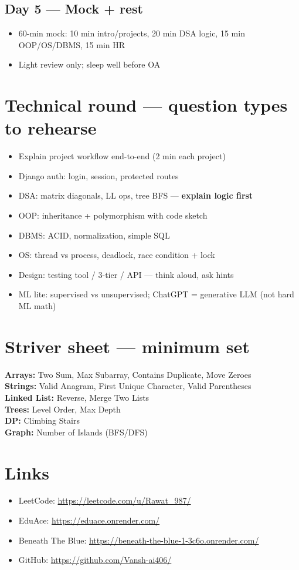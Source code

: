 \documentclass[11pt,a4paper]{article}
\begin{document}
\subsection{Day 5 --- Mock + rest}
\begin{itemize}
  \item 60-min mock: 10 min intro/projects, 20 min DSA logic, 15 min OOP/OS/DBMS, 15 min HR
  \item Light review only; sleep well before OA
\end{itemize}

\section{Technical round --- question types to rehearse}
\begin{itemize}
  \item Explain project workflow end-to-end (2 min each project)
  \item Django auth: login, session, protected routes
  \item DSA: matrix diagonals, LL ops, tree BFS --- \textbf{explain logic first}
  \item OOP: inheritance + polymorphism with code sketch
  \item DBMS: ACID, normalization, simple SQL
  \item OS: thread vs process, deadlock, race condition + lock
  \item Design: testing tool / 3-tier / API --- think aloud, ask hints
  \item ML lite: supervised vs unsupervised; ChatGPT = generative LLM (not hard ML math)
\end{itemize}

\section{Striver sheet --- minimum set}
\textbf{Arrays:} Two Sum, Max Subarray, Contains Duplicate, Move Zeroes\\
\textbf{Strings:} Valid Anagram, First Unique Character, Valid Parentheses\\
\textbf{Linked List:} Reverse, Merge Two Lists\\
\textbf{Trees:} Level Order, Max Depth\\
\textbf{DP:} Climbing Stairs\\
\textbf{Graph:} Number of Islands (BFS/DFS)

\section{Links}
\begin{itemize}
  \item LeetCode: \url{https://leetcode.com/u/Rawat_987/}
  \item EduAce: \url{https://eduace.onrender.com/}
  \item Beneath The Blue: \url{https://beneath-the-blue-1-3c6o.onrender.com/}
  \item GitHub: \url{https://github.com/Vansh-ai406/}
\end{itemize}
\end{document}
